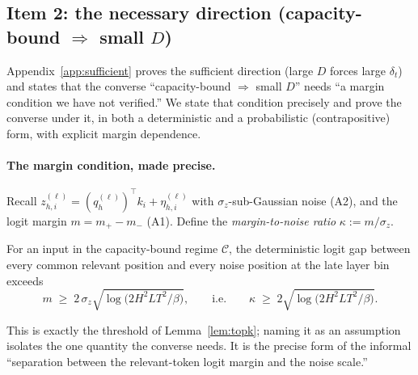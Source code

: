 \subsection{Item 2: the necessary direction (capacity-bound $\Rightarrow$ small $D$)}
\label{app:necessary}

Appendix~\ref{app:sufficient} proves the sufficient direction (large $D$
forces large $\delta_t$) and states that the converse ``capacity-bound
$\Rightarrow$ small $D$'' needs ``a margin condition we have not verified.''
We state that condition precisely and prove the converse under it, in both a
deterministic and a probabilistic (contrapositive) form, with explicit margin
dependence.

\paragraph{The margin condition, made precise.} Recall
$z^{(\ell)}_{h,i}=(q^{(\ell)}_h)^\top k_i + \eta^{(\ell)}_{h,i}$ with
$\sigma_z$-sub-Gaussian noise (A2), and the logit margin $m=m_+-m_-$ (A1).
Define the \emph{margin-to-noise ratio} $\kappa := m/\sigma_z$.

\begin{assumption}
\label{ass:margin}
For an input in the capacity-bound regime $\mathcal{C}$, the deterministic
logit gap between every common relevant position and every noise position at
the late layer bin exceeds
\begin{equation}
\label{eq:margin-cond}
m \;\ge\; 2\,\sigma_z\sqrt{\log\!\bigl(2 H^2 L T^2/\beta\bigr)},
\qquad\text{i.e.}\qquad
\kappa \;\ge\; 2\sqrt{\log\!\bigl(2 H^2 L T^2/\beta\bigr)} .
\end{equation}
\end{assumption}
This is exactly the threshold of Lemma~\ref{lem:topk}; naming it as an
assumption isolates the one quantity the converse needs. It is the precise form
of the informal ``separation between the relevant-token logit margin and the
noise scale.''

